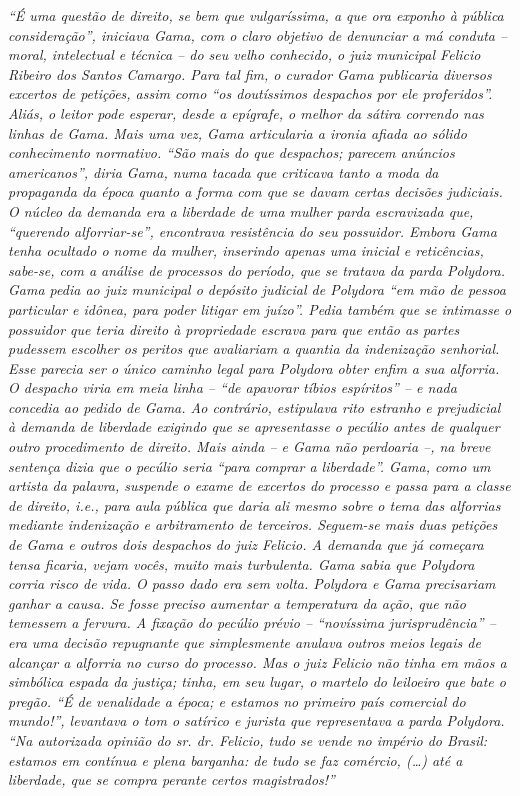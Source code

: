 {\begin{flushright}
\begin{didascalia}
\emph{``É uma questão de direito, se bem que vulgaríssima, a que ora
exponho à pública consideração'', iniciava Gama, com o claro objetivo de
denunciar a má conduta -- moral, intelectual e técnica -- do seu velho
conhecido, o juiz municipal Felicio Ribeiro dos Santos Camargo. Para tal
fim, o curador Gama publicaria diversos excertos de petições, assim como
``os doutíssimos despachos por ele proferidos''. Aliás, o leitor pode
esperar, desde a epígrafe, o melhor da sátira correndo nas linhas de
Gama. Mais uma vez, Gama articularia a ironia afiada ao sólido
conhecimento normativo. ``São mais do que despachos; parecem anúncios
americanos'', diria Gama, numa tacada que criticava tanto a moda da
propaganda da época quanto a forma com que se davam certas decisões
judiciais. O núcleo da demanda era a liberdade de uma mulher parda
escravizada que, ``querendo alforriar-se'', encontrava resistência do seu
possuidor. Embora Gama tenha ocultado o nome da mulher, inserindo apenas
uma inicial e reticências, sabe-se, com a análise de processos do
período, que se tratava da parda Polydora. Gama pedia ao juiz municipal
o depósito judicial de Polydora ``em mão de pessoa particular e idônea,
para poder litigar em juízo''. Pedia também que se intimasse o possuidor
que teria direito à propriedade escrava para que então as partes
pudessem escolher os peritos que avaliariam a quantia da indenização
senhorial. Esse parecia ser o único caminho legal para Polydora obter
enfim a sua alforria. O despacho viria em meia linha -- ``de apavorar
tíbios espíritos'' -- e nada concedia ao pedido de Gama. Ao contrário,
estipulava rito estranho e prejudicial à demanda de liberdade exigindo
que se apresentasse o pecúlio antes de qualquer outro procedimento de
direito. Mais ainda -- e Gama não perdoaria --, na breve sentença dizia
que o pecúlio seria ``para comprar a liberdade''. Gama, como um artista da
palavra, suspende o exame de excertos do processo e passa para a classe
de direito, i.e., para aula pública que daria ali mesmo sobre o tema das
alforrias mediante indenização e arbitramento de terceiros. Seguem-se
mais duas petições de Gama e outros dois despachos do juiz Felicio. A
demanda que já começara tensa ficaria, vejam vocês, muito mais
turbulenta. Gama sabia que Polydora corria risco de vida. O passo dado
era sem volta. Polydora e Gama precisariam ganhar a causa. Se fosse
preciso aumentar a temperatura da ação, que não temessem a fervura. A
fixação do pecúlio prévio -- ``novíssima jurisprudência'' -- era uma
decisão repugnante que simplesmente anulava outros meios legais de
alcançar a alforria no curso do processo. Mas o juiz Felicio não tinha
em mãos a simbólica espada da justiça; tinha, em seu lugar, o martelo do
leiloeiro que bate o pregão. ``É de venalidade a época; e estamos no
primeiro país comercial do mundo!'', levantava o tom o satírico e jurista
que representava a parda Polydora. ``Na autorizada opinião do sr. dr.
Felicio, tudo se vende no império do Brasil: estamos em contínua e plena
barganha: de tudo se faz comércio, (\ldots{}) até a liberdade, que se compra
perante certos magistrados!''}
\end{didascalia}


\end{flushright}}
